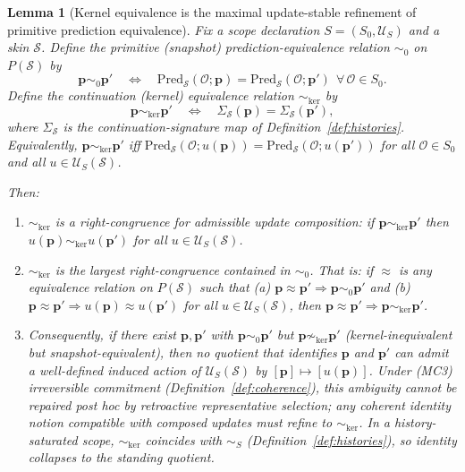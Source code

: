 \documentclass[11pt]{article}
\newtheorem{lemma}[definition]{Lemma}
\theoremstyle{remark}
\newcommand{\Skin}{\mathcal{S}}
\begin{document}
\begin{lemma}[Kernel equivalence is the maximal update-stable refinement of primitive prediction equivalence]
\label{lem:kernel-equivalence}
Fix a scope declaration $S=(S_0,\mathcal{U}_S)$ and a skin $\Skin$.
Define the \emph{primitive} (snapshot) prediction-equivalence relation $\sim_{0}$ on $P(\Skin)$ by
\[
\mathbf{p}\sim_{0}\mathbf{p}' \quad\Longleftrightarrow\quad
\mathrm{Pred}_{\Skin}(\mathcal{O};\mathbf{p})=\mathrm{Pred}_{\Skin}(\mathcal{O};\mathbf{p}')
\ \ \forall\,\mathcal{O}\in S_0.
\]
Define the \emph{continuation} (kernel) equivalence relation $\sim_{\ker}$ by
\[
\mathbf{p}\sim_{\ker}\mathbf{p}' \quad\Longleftrightarrow\quad
\Sigma_{\Skin}(\mathbf{p})=\Sigma_{\Skin}(\mathbf{p}'),
\]
where $\Sigma_{\Skin}$ is the continuation-signature map of Definition~\ref{def:histories}.
Equivalently, $\mathbf{p}\sim_{\ker}\mathbf{p}'$ iff
$\mathrm{Pred}_{\Skin}(\mathcal{O};u(\mathbf{p}))=\mathrm{Pred}_{\Skin}(\mathcal{O};u(\mathbf{p}'))$
for all $\mathcal{O}\in S_0$ and all $u\in\mathcal{U}_S(\Skin)$.

Then:
\begin{enumerate}[label=(\roman*),leftmargin=2.2em]
\item $\sim_{\ker}$ is a right-congruence for admissible update composition:
if $\mathbf{p}\sim_{\ker}\mathbf{p}'$ then $u(\mathbf{p})\sim_{\ker}u(\mathbf{p}')$ for all $u\in\mathcal{U}_S(\Skin)$.
\item $\sim_{\ker}$ is the \emph{largest} right-congruence contained in $\sim_{0}$.
That is: if $\approx$ is any equivalence relation on $P(\Skin)$ such that
(a) $\mathbf{p}\approx \mathbf{p}'\Rightarrow \mathbf{p}\sim_{0}\mathbf{p}'$ and
(b) $\mathbf{p}\approx \mathbf{p}'\Rightarrow u(\mathbf{p})\approx u(\mathbf{p}')$ for all $u\in\mathcal{U}_S(\Skin)$,
then $\mathbf{p}\approx \mathbf{p}'\Rightarrow \mathbf{p}\sim_{\ker}\mathbf{p}'$.
\item Consequently, if there exist $\mathbf{p},\mathbf{p}'$ with $\mathbf{p}\sim_{0}\mathbf{p}'$ but $\mathbf{p}\not\sim_{\ker}\mathbf{p}'$
(kernel-inequivalent but snapshot-equivalent), then no quotient that identifies $\mathbf{p}$ and $\mathbf{p}'$ can admit
a well-defined induced action of $\mathcal{U}_S(\Skin)$ by $[\mathbf{p}]\mapsto [u(\mathbf{p})]$.
Under (MC3) irreversible commitment (Definition~\ref{def:coherence}), this ambiguity cannot be repaired post hoc by
retroactive representative selection; any coherent identity notion compatible with composed updates must refine to $\sim_{\ker}$.
In a history-saturated scope, $\sim_{\ker}$ coincides with $\sim_S$ (Definition~\ref{def:histories}), so identity collapses to the standing quotient.
\end{enumerate}
\end{lemma}
\end{document}

